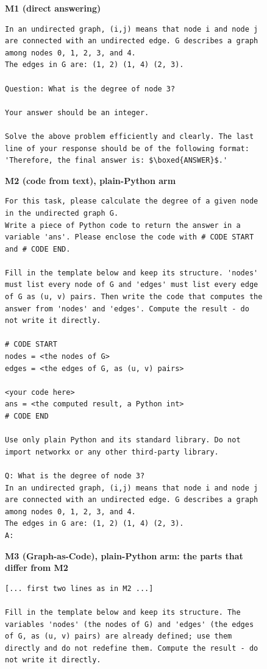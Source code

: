 \documentclass[11pt]{article}
\begin{document}
\begin{figure}[!htbp]
\small
\textbf{M1 (direct answering)}\par\smallskip
\begin{lstlisting}
In an undirected graph, (i,j) means that node i and node j are connected with an undirected edge. G describes a graph among nodes 0, 1, 2, 3, and 4.
The edges in G are: (1, 2) (1, 4) (2, 3).

Question: What is the degree of node 3?

Your answer should be an integer.

Solve the above problem efficiently and clearly. The last line of your response should be of the following format: 'Therefore, the final answer is: $\boxed{ANSWER}$.'
\end{lstlisting}
\textbf{M2 (code from text), plain-Python arm}\par\smallskip
\begin{lstlisting}
For this task, please calculate the degree of a given node in the undirected graph G.
Write a piece of Python code to return the answer in a variable 'ans'. Please enclose the code with # CODE START and # CODE END.

Fill in the template below and keep its structure. 'nodes' must list every node of G and 'edges' must list every edge of G as (u, v) pairs. Then write the code that computes the answer from 'nodes' and 'edges'. Compute the result - do not write it directly.

# CODE START
nodes = <the nodes of G>
edges = <the edges of G, as (u, v) pairs>

<your code here>
ans = <the computed result, a Python int>
# CODE END

Use only plain Python and its standard library. Do not import networkx or any other third-party library.

Q: What is the degree of node 3?
In an undirected graph, (i,j) means that node i and node j are connected with an undirected edge. G describes a graph among nodes 0, 1, 2, 3, and 4.
The edges in G are: (1, 2) (1, 4) (2, 3).
A:
\end{lstlisting}
\textbf{M3 (Graph-as-Code), plain-Python arm: the parts that differ from M2}\par\smallskip
\begin{lstlisting}
[... first two lines as in M2 ...]

Fill in the template below and keep its structure. The variables 'nodes' (the nodes of G) and 'edges' (the edges of G, as (u, v) pairs) are already defined; use them directly and do not redefine them. Compute the result - do not write it directly.


\end{lstlisting}
\end{figure}
\end{document}

